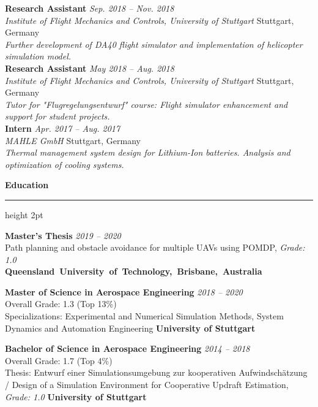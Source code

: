 \documentclass[11pt,a4paper]{article}
\newcommand{\sectiontitle}[1]{%
    \vspace{10pt}
    {\Large\bfseries\color{darkblue}#1}
    \nopagebreak
    \vspace{6pt}
    {\color{accentgreen}\hrule height 2pt}
    \vspace{8pt}
}
\newcommand{\jobtitle}[5]{%
    \textbf{#1} \hfill \textit{\small #2}\\
    {\color{darkblue}\textit{#3}} \hfill {\small #4}\\
    \textit{#5}\\[8pt]
}
\newcommand{\degreeline}[4]{%
    \textbf{#1} \hfill \textit{\small #2}\\
    {\small #3} \hfill {\color{darkblue}\textbf{#4}}\\[3pt]
}
\begin{document}
\vspace{5pt}

\jobtitle{Research Assistant}{Sep. 2018 -- Nov. 2018}{Institute of Flight Mechanics and Controls, University of Stuttgart}{Stuttgart, Germany}{Further development of DA40 flight simulator and implementation of helicopter simulation model.}


\jobtitle{Research Assistant}{May 2018 -- Aug. 2018}{Institute of Flight Mechanics and Controls, University of Stuttgart}{Stuttgart, Germany}{Tutor for "Flugregelungsentwurf" course: Flight simulator enhancement and support for student projects.}



\jobtitle{Intern}{Apr. 2017 -- Aug. 2017}{MAHLE GmbH}{Stuttgart, Germany}{Thermal management system design for Lithium-Ion batteries. Analysis and optimization of cooling systems.}




\newpage

\sectiontitle{Education}

\degreeline{Master's Thesis}{2019 -- 2020}{Path planning and obstacle avoidance for multiple UAVs using POMDP, \textit{Grade: 1.0} \\ }{\qquad \qquad \qquad \qquad \qquad \qquad \quad \qquad \qquad \qquad \qquad \mbox{Queensland University of Technology, Brisbane, Australia}}

\vspace{5pt}

\degreeline{Master of Science in Aerospace Engineering}{2018 -- 2020}{Overall Grade: 1.3 (Top 13\%) \\Specializations: Experimental and Numerical Simulation Methods, System Dynamics and Automation Engineering\phantom{very long thesis description text to balance the alignment}}{University of Stuttgart}

\vspace{5pt}

\degreeline{Bachelor of Science in Aerospace Engineering}{2014 -- 2018}{Overall Grade: 1.7 (Top 4\%) \\Thesis: Entwurf einer Simulationsumgebung zur kooperativen Aufwindschätzung / Design of a Simulation Environment for Cooperative Updraft Estimation, \textit{Grade: 1.0}}{University of Stuttgart}
\end{document}
